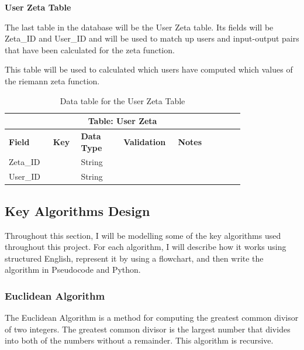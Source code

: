 \documentclass[12pt]{article}
\begin{document}
\textbf{User Zeta Table}

The last table in the database will be the User Zeta table. Its fields will be Zeta\_ID and User\_ID and will be used to match up users and input-output pairs that have been calculated for the zeta function.

This table will be used to calculated which users have computed which values of the riemann zeta function.

\begin{table}[ht]
    \centering
    \begin{tabular}{ | p{0.15\linewidth} | p{0.1\linewidth} | p{0.16\linewidth} | p{0.14\linewidth} | p{0.25\linewidth} | }
    \hline
    \multicolumn{5}{|c|}{\textbf{Table: User Zeta}}\\
    \hline
    \hline
    \textbf{Field} & \textbf{Key} & \textbf{Data Type} & \textbf{Validation} & \textbf{Notes} \\
    \hline
    Zeta\_ID & & String & & \\
    \hline
    User\_ID & & String & & \\
    \hline
    \end{tabular}
    \caption{Data table for the User Zeta Table}
\end{table}

\clearpage

\subsection{Key Algorithms Design}
Throughout this section, I will be modelling some of the key algorithms used throughout this project. For each algorithm, I will describe how it works using structured English, represent it by using a flowchart, and then write the algorithm in Pseudocode and Python.

\subsubsection{Euclidean Algorithm}
The Euclidean Algorithm is a method for computing the greatest common divisor of two integers. The greatest common divisor is the largest number that divides into both of the numbers without a remainder. This algorithm is recursive.
\end{document}

